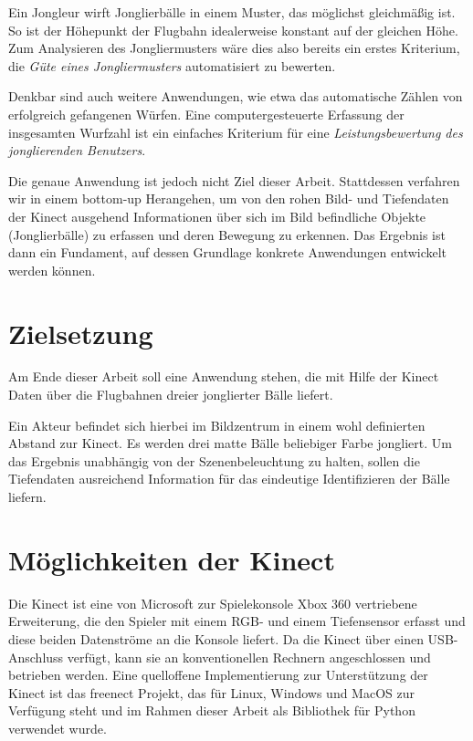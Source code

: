 \documentclass[12pt,a4paper,ngerman]{scrartcl}
\begin{document}
Ein Jongleur wirft Jonglierbälle in einem Muster, das möglichst gleichmäßig ist.
So ist der Höhepunkt der Flugbahn idealerweise konstant auf der gleichen Höhe.
Zum Analysieren des Jongliermusters wäre dies also bereits ein erstes Kriterium, 
die \textit{Güte eines Jongliermusters} automatisiert zu bewerten.

Denkbar sind auch weitere Anwendungen, wie etwa das automatische Zählen von 
erfolgreich gefangenen Würfen. Eine computergesteuerte Erfassung der insgesamten
Wurfzahl ist ein einfaches Kriterium für eine \textit{Leistungsbewertung des 
jonglierenden Benutzers}.

Die genaue Anwendung ist jedoch nicht Ziel dieser Arbeit. Stattdessen verfahren wir
in einem bottom-up Herangehen, um von den rohen Bild- und Tiefendaten der Kinect 
ausgehend Informationen über sich im Bild befindliche Objekte (Jonglierbälle) zu
erfassen und deren Bewegung zu erkennen. Das Ergebnis ist dann ein Fundament, auf
dessen Grundlage konkrete Anwendungen entwickelt werden können.

\section{Zielsetzung}

Am Ende dieser Arbeit soll eine Anwendung stehen, die mit Hilfe der Kinect Daten 
über die Flugbahnen dreier jonglierter Bälle liefert. 

Ein Akteur befindet sich hierbei im Bildzentrum in einem wohl definierten Abstand 
zur Kinect. Es werden drei matte Bälle beliebiger Farbe jongliert. Um das Ergebnis
unabhängig von der Szenenbeleuchtung zu halten, sollen die Tiefendaten ausreichend
Information für das eindeutige Identifizieren der Bälle liefern.

\section{Möglichkeiten der Kinect}

Die Kinect ist eine von Microsoft zur Spielekonsole Xbox 360 vertriebene Erweiterung,
die den Spieler mit einem RGB- und einem Tiefensensor erfasst und diese beiden 
Datenströme an die Konsole liefert. Da die Kinect über einen USB-Anschluss verfügt,
kann sie an konventionellen Rechnern angeschlossen und betrieben werden. Eine 
quelloffene Implementierung zur Unterstützung der Kinect ist das freenect Projekt,
das für Linux, Windows und MacOS zur Verfügung steht und im Rahmen dieser Arbeit
als Bibliothek für Python verwendet wurde.\cite{openkinect}\cite{libfreenect}
\end{document}
